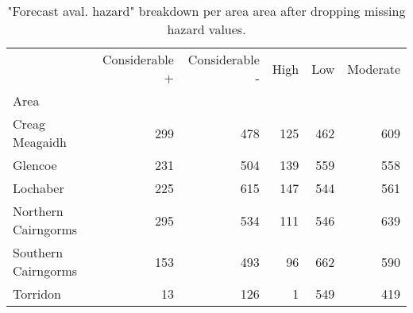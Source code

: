 \begin{table}[H]
\caption{"Forecast aval. hazard" breakdown per area area after dropping missing hazard values.}
\label{tbl:sais_hazard_breakdown_per_area}
\begin{tabular}{lrrrrr}
\toprule
 & Considerable + & Considerable - & High & Low & Moderate \\
Area &  &  &  &  &  \\
\midrule
Creag Meagaidh & 299 & 478 & 125 & 462 & 609 \\
Glencoe & 231 & 504 & 139 & 559 & 558 \\
Lochaber & 225 & 615 & 147 & 544 & 561 \\
Northern Cairngorms & 295 & 534 & 111 & 546 & 639 \\
Southern Cairngorms & 153 & 493 & 96 & 662 & 590 \\
Torridon & 13 & 126 & 1 & 549 & 419 \\
\bottomrule
\end{tabular}
\end{table}
